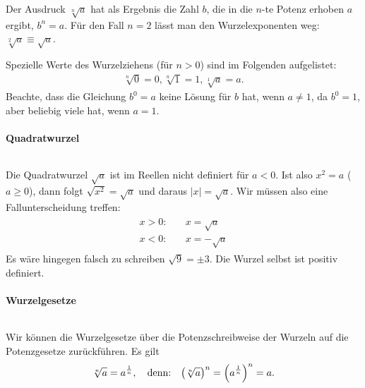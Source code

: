 Der Ausdruck $\sqrt[n]{a}$ hat als Ergebnis die Zahl $b$, die in die $n$-te Potenz erhoben $a$ ergibt, $b^n = a$. Für den Fall $n=2$ lässt man den Wurzelexponenten weg: $\sqrt[2]{a} \equiv \sqrt{a}$.

Spezielle Werte des Wurzelziehens (für $n> 0$) sind im Folgenden aufgelistet: 
\begin{align}
    \sqrt[n]{0} = 0, \sqrt[n]{1} = 1, \sqrt[1]{a} = a.
\end{align}
Beachte, dass die Gleichung $b^0 = a$ keine Lösung für $b$ hat, wenn $a \neq 1$, da $b^0 = 1$, aber beliebig viele hat, wenn $a=1$.

\paragraph{Quadratwurzel}$~$

Die Quadratwurzel $\sqrt{a}$ ist im Reellen nicht definiert für $a<0$. Ist also $x^2 = a$ ($a\ge0$), dann folgt $\sqrt{x^2}= \sqrt{a}$ und daraus $|x| = \sqrt{a}$. Wir müssen also eine Fallunterscheidung treffen: 
\begin{align}
    \begin{split}
        x > 0: &\quad x = \sqrt{a} \\
        x < 0: &\quad x = -\sqrt{a}
    \end{split}
\end{align}
Es wäre hingegen falsch zu schreiben $\sqrt{9} = \pm 3$. Die Wurzel selbst ist positiv definiert.

\paragraph{Wurzelgesetze}$~$

Wir können die Wurzelgesetze über die Potenzschreibweise der Wurzeln auf die Potenzgesetze zurückführen. Es gilt 
\begin{align}
    \sqrt[n]{a} = a^{\frac{1}{n}}, \qq{denn:} \qty(\sqrt[n]{a})^n = \qty(a^{\frac{1}{n}})^n = a.
\end{align}

